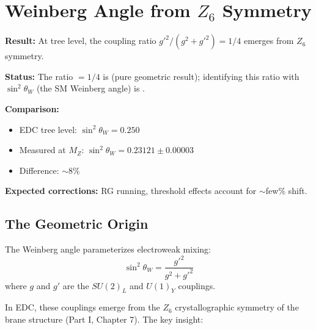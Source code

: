 \section{Weinberg Angle from $Z_6$ Symmetry}
\label{sec:weinberg}

\begin{tcolorbox}[edcGuardrail, title=\textbf{Epistemic Status: Weinberg Angle}]
\textbf{Result:} At tree level, the coupling ratio $g'^2/(g^2 + g'^2) = 1/4$ emerges from $Z_6$ symmetry.

\textbf{Status:} The ratio $= 1/4$ is \tagDerSym{} (pure geometric result);
identifying this ratio with $\sin^2\theta_W$ (the SM Weinberg angle) is \tagDc{}.

\textbf{Comparison:}
\begin{itemize}[nosep]
\item EDC tree level: $\sin^2\theta_W = 0.250$
\item Measured at $M_Z$: $\sin^2\theta_W = 0.23121 \pm 0.00003$ \tagBL{}
\item Difference: $\sim 8\%$
\end{itemize}

\textbf{Expected corrections:} RG running, threshold effects account for $\sim$few\% shift.
\end{tcolorbox}

\subsection{The Geometric Origin}

The Weinberg angle parameterizes electroweak mixing:
\begin{equation}
\sin^2\theta_W = \frac{g'^2}{g^2 + g'^2}
\label{eq:weinberg_def}
\end{equation}
where $g$ and $g'$ are the $SU(2)_L$ and $U(1)_Y$ couplings.

In EDC, these couplings emerge from the $Z_6$ crystallographic symmetry of the
brane structure (Part I, Chapter 7). The key insight:

